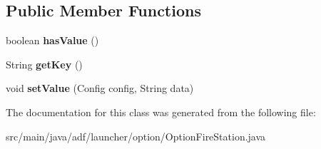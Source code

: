 \subsection*{Public Member Functions}
\begin{DoxyCompactItemize}
\item 
\hypertarget{classadf_1_1launcher_1_1option_1_1OptionFireStation_ab50dda3cb829d8e0c108cfbc87b29a3f}{}\label{classadf_1_1launcher_1_1option_1_1OptionFireStation_ab50dda3cb829d8e0c108cfbc87b29a3f} 
boolean {\bfseries has\+Value} ()
\item 
\hypertarget{classadf_1_1launcher_1_1option_1_1OptionFireStation_a5abc3eb7e6f919d19718b2c18828dda6}{}\label{classadf_1_1launcher_1_1option_1_1OptionFireStation_a5abc3eb7e6f919d19718b2c18828dda6} 
String {\bfseries get\+Key} ()
\item 
\hypertarget{classadf_1_1launcher_1_1option_1_1OptionFireStation_a154335cd5a612b4f28a1c2ca3ddff50f}{}\label{classadf_1_1launcher_1_1option_1_1OptionFireStation_a154335cd5a612b4f28a1c2ca3ddff50f} 
void {\bfseries set\+Value} (Config config, String data)
\end{DoxyCompactItemize}


The documentation for this class was generated from the following file\+:\begin{DoxyCompactItemize}
\item 
src/main/java/adf/launcher/option/Option\+Fire\+Station.\+java\end{DoxyCompactItemize}
